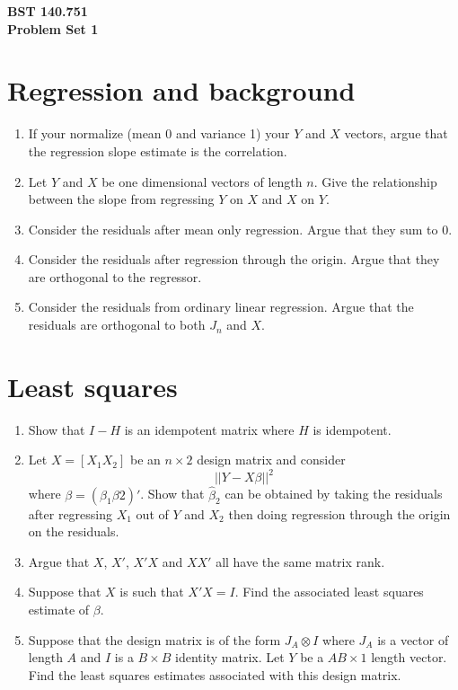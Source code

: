 \documentclass[12pt]{article}
\begin{document}
\noindent
{\bf BST 140.751 \\ Problem Set 1} \\

\section{Regression and background}
\begin{enumerate}[1.]
\item If your normalize (mean 0 and variance 1) your $Y$ and $X$ vectors,
argue that the regression slope estimate is the correlation.
\item Let $Y$ and $X$ be one dimensional vectors of length $n$. Give
the relationship between the slope from regressing $Y$ on $X$ and $X$
on $Y$.
\item Consider the residuals after mean only regression. Argue
that they sum to 0.
\item Consider the residuals after regression through the origin.
Argue that they are orthogonal to the regressor.
\item Consider the residuals from ordinary linear regression. Argue
that the residuals are orthogonal to both $J_n$ and $X$.
\end{enumerate}

\section{Least squares}
\begin{enumerate}[1.]
\item Show that $I - H$ is an idempotent matrix where $H$ is idempotent.
\item Let $X = [X_1 X_2]$ be an $n\times 2$ design matrix and consider 
$$|| Y - X \beta ||^2$$ where $\beta = (\beta_1 \beta2)'$. Show
that $\hat \beta_2$ can be obtained by taking the residuals after
regressing $X_1$ out of $Y$ and $X_2$ then doing regression through
the origin on the residuals.
\item Argue that $X$, $X'$, $X'X$ and $XX'$ all have the same matrix rank.
\item Suppose that $X$ is such that $X'X = I$. Find the associated least
squares estimate of $\beta$.
\item Suppose that the design matrix is of the form $J_A \otimes I$ where
$J_A$ is a vector of length $A$ and $I$ is a $B\times B$ identity matrix. 
Let $Y$ be a $AB \times 1$ length vector. Find the least squares estimates
associated with this design matrix.

\end{enumerate}
\end{document}
